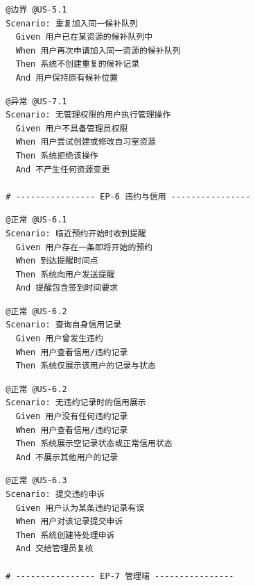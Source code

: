 \documentclass[11pt,a4paper]{article}
\begin{document}
\begin{framed}
\small
\begin{verbatim}
  @边界 @US-5.1
  Scenario: 重复加入同一候补队列
    Given 用户已在某资源的候补队列中
    When 用户再次申请加入同一资源的候补队列
    Then 系统不创建重复的候补记录
    And 用户保持原有候补位置
\end{verbatim}
\end{framed}

\begin{framed}
\small
\begin{verbatim}
  @异常 @US-7.1
  Scenario: 无管理权限的用户执行管理操作
    Given 用户不具备管理员权限
    When 用户尝试创建或修改自习室资源
    Then 系统拒绝该操作
    And 不产生任何资源变更

  # ---------------- EP-6 违约与信用 ----------------
\end{verbatim}
\end{framed}

\begin{framed}
\small
\begin{verbatim}
  @正常 @US-6.1
  Scenario: 临近预约开始时收到提醒
    Given 用户存在一条即将开始的预约
    When 到达提醒时间点
    Then 系统向用户发送提醒
    And 提醒包含签到时间要求
\end{verbatim}
\end{framed}

\begin{framed}
\small
\begin{verbatim}
  @正常 @US-6.2
  Scenario: 查询自身信用记录
    Given 用户曾发生违约
    When 用户查看信用/违约记录
    Then 系统仅展示该用户的记录与状态
\end{verbatim}
\end{framed}

\begin{framed}
\small
\begin{verbatim}
  @正常 @US-6.2
  Scenario: 无违约记录时的信用展示
    Given 用户没有任何违约记录
    When 用户查看信用/违约记录
    Then 系统展示空记录状态或正常信用状态
    And 不展示其他用户的记录
\end{verbatim}
\end{framed}

\begin{framed}
\small
\begin{verbatim}
  @正常 @US-6.3
  Scenario: 提交违约申诉
    Given 用户认为某条违约记录有误
    When 用户对该记录提交申诉
    Then 系统创建待处理申诉
    And 交给管理员复核

  # ---------------- EP-7 管理端 ----------------
\end{verbatim}
\end{framed}
\end{document}

